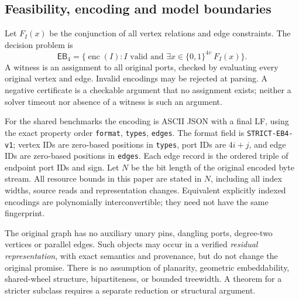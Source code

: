 \documentclass[11pt,letterpaper]{article}
\theoremstyle{definition}
\newcommand{\EB}{\ensuremath{\mathsf{EB}_4}}
\newcommand{\bits}{\{0,1\}}
\newcommand{\id}[1]{\nolinkurl{#1}}
\begin{document}
\subsection{Feasibility, encoding and model boundaries}
Let \(F_I(x)\) be the conjunction of all vertex relations and edge constraints. The decision problem is
\[
 \EB=\{\operatorname{enc}(I): I\text{ valid and }\exists x\in\bits^{4v}\ F_I(x)\}.
\]
A witness is an assignment to all original ports, checked by evaluating every original vertex and edge. Invalid encodings may be rejected at parsing. A negative certificate is a checkable argument that no assignment exists; neither a solver timeout nor absence of a witness is such an argument.

For the shared benchmarks the encoding is ASCII JSON with a final LF, using the exact property order \id{format}, \id{types}, \id{edges}. The format field is \id{STRICT-EB4-v1}; vertex IDs are zero-based positions in \id{types}, port IDs are \(4i+j\), and edge IDs are zero-based positions in \id{edges}. Each edge record is the ordered triple of endpoint port IDs and sign. Let \(N\) be the bit length of the original encoded byte stream. All resource bounds in this paper are stated in \(N\), including all index widths, source reads and representation changes. Equivalent explicitly indexed encodings are polynomially interconvertible; they need not have the same fingerprint.

The original graph has no auxiliary unary pins, dangling ports, degree-two vertices or parallel edges. Such objects may occur in a verified \emph{residual representation}, with exact semantics and provenance, but do not change the original promise. There is no assumption of planarity, geometric embeddability, shared-wheel structure, bipartiteness, or bounded treewidth. A theorem for a stricter subclass requires a separate reduction or structural argument.
\end{document}
